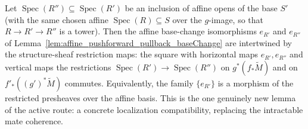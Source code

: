 \begin{lemma}
  \label{lem:pushforwardPullbackBaseChange_restrict_naturality}
  Let \(\operatorname{Spec}(R'') \subseteq \operatorname{Spec}(R')\) be an inclusion of
  affine opens of the base \(S'\) (with the same chosen affine
  \(\operatorname{Spec}(R) \subseteq S\) over the \(g\)-image, so that
  \(R \to R' \to R''\) is a tower). Then the affine base-change isomorphisms
  \(e_{R'}\) and \(e_{R''}\) of
  Lemma~\ref{lem:affine_pushforward_pullback_baseChange} are intertwined by the
  structure-sheaf restriction maps: the square with horizontal maps \(e_{R'}, e_{R''}\)
  and vertical maps the restrictions
  \(\operatorname{Spec}(R') \to \operatorname{Spec}(R'')\) on
  \(g^*(f_*\widetilde{M})\) and on \(f'_*((g')^*\widetilde{M})\) commutes. Equivalently,
  the family \(\{e_{R'}\}\) is a morphism of the restricted presheaves over the affine
  basis. This is the one genuinely new lemma of the active route: a concrete
  localization compatibility, replacing the intractable mate coherence.
\end{lemma}


